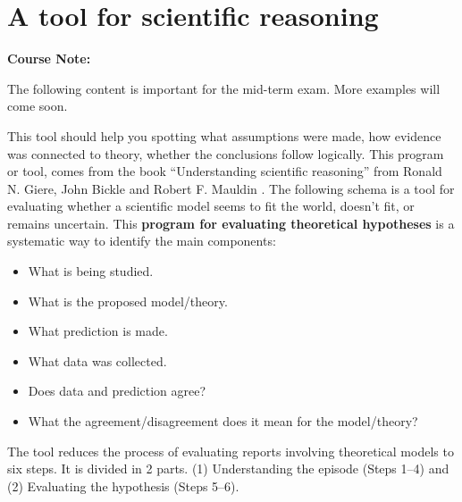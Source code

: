 \documentclass[
  12pt,
]{book}
\providecommand{\tightlist}{%
  \setlength{\itemsep}{0pt}\setlength{\parskip}{0pt}}
\begin{document}
\section{A tool for scientific reasoning}\label{a-tool-for-scientific-reasoning}

\begin{notebox}

\begin{center}
\textbf{Course Note:}

\end{center}

The following content is important for the mid-term exam. More examples will come soon.

\end{notebox}

This tool should help you spotting what assumptions were made, how evidence was connected to theory, whether the conclusions follow logically. This program or tool, comes from the book ``Understanding scientific reasoning'' from Ronald N. Giere, John Bickle and Robert F. Mauldin \citep{giere2006understanding}. The following schema is a tool for evaluating whether a scientific model seems to fit the world, doesn't fit, or remains uncertain. This \textbf{program for evaluating theoretical hypotheses} is a systematic way to identify the main components:

\begin{itemize}
\tightlist
\item
  What is being studied.
\item
  What is the proposed model/theory.
\item
  What prediction is made.
\item
  What data was collected.
\item
  Does data and prediction agree?
\item
  What the agreement/disagreement does it mean for the model/theory?
\end{itemize}

The tool reduces the process of evaluating reports involving theoretical models to six steps. It is divided in 2 parts. (1) Understanding the episode (Steps 1--4) and (2) Evaluating the hypothesis (Steps 5--6).
\end{document}
